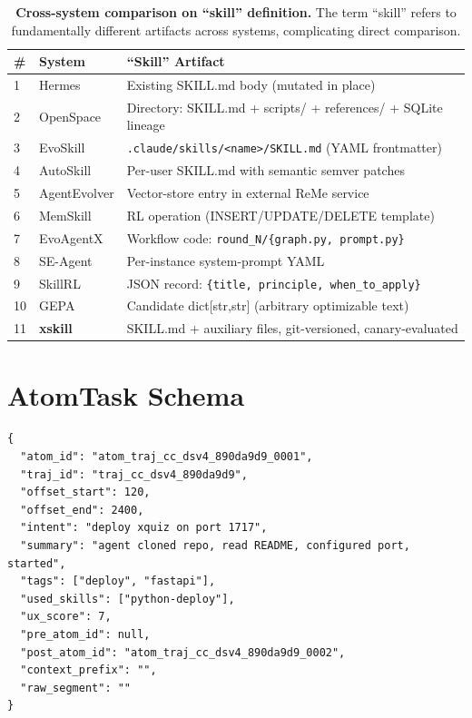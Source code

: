 \documentclass[11pt]{article}
\begin{document}
\begin{table}[h!]
\centering
\caption{\textbf{Cross-system comparison on ``skill'' definition.} The term ``skill'' refers to fundamentally different artifacts across systems, complicating direct comparison.}
\label{tab:skill-def}
\small
\begin{tabular}{@{}llp{6cm}@{}}
\toprule
\textbf{\#} & \textbf{System} & \textbf{``Skill'' Artifact} \\
\midrule
1 & Hermes & Existing SKILL.md body (mutated in place) \\
2 & OpenSpace & Directory: SKILL.md + scripts/ + references/ + SQLite lineage \\
3 & EvoSkill & \texttt{.claude/skills/<name>/SKILL.md} (YAML frontmatter) \\
4 & AutoSkill & Per-user SKILL.md with semantic semver patches \\
5 & AgentEvolver & Vector-store entry in external ReMe service \\
6 & MemSkill & RL operation (INSERT/UPDATE/DELETE template) \\
7 & EvoAgentX & Workflow code: \texttt{round\_N/\{graph.py, prompt.py\}} \\
8 & SE-Agent & Per-instance system-prompt YAML \\
9 & SkillRL & JSON record: \texttt{\{title, principle, when\_to\_apply\}} \\
10 & GEPA & Candidate dict[str,str] (arbitrary optimizable text) \\
\midrule
11 & \textbf{xskill} & SKILL.md + auxiliary files, git-versioned, canary-evaluated \\
\bottomrule
\end{tabular}
\end{table}

\section{AtomTask Schema}
\label{app:atomtask}

\begin{verbatim}
{
  "atom_id": "atom_traj_cc_dsv4_890da9d9_0001",
  "traj_id": "traj_cc_dsv4_890da9d9",
  "offset_start": 120,
  "offset_end": 2400,
  "intent": "deploy xquiz on port 1717",
  "summary": "agent cloned repo, read README, configured port, started",
  "tags": ["deploy", "fastapi"],
  "used_skills": ["python-deploy"],
  "ux_score": 7,
  "pre_atom_id": null,
  "post_atom_id": "atom_traj_cc_dsv4_890da9d9_0002",
  "context_prefix": "",
  "raw_segment": ""
}
\end{verbatim}
\end{document}
